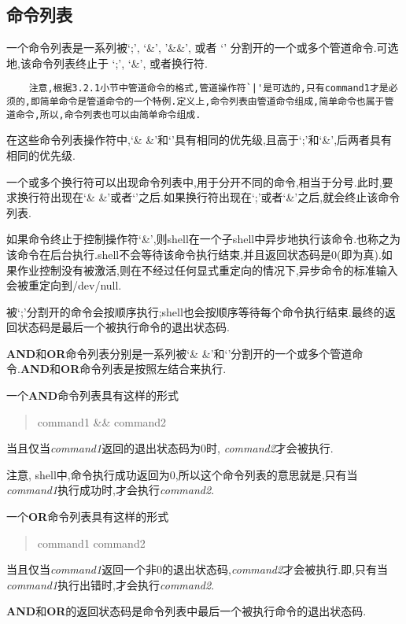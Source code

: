 \documentclass[draft,openany]{book}
\begin{document}
\begin{CJK}{UTF8}{gbsn}
    \subsection{命令列表}
    一个命令列表是一系列被`;', `\&', '\&\&', 或者 `\textbar \textbar' 分割开的一个或多个管道命令.可选地,该命令列表终止于 `;', `\&', 或者换行符.\par
    \begin{verbatim}
    注意,根据3.2.1小节中管道命令的格式,管道操作符`|'是可选的,只有command1才是必须的,即简单命令是管道命令的一个特例.定义上,命令列表由管道命令组成,简单命令也属于管道命令,所以,命令列表也可以由简单命令组成.
    \end{verbatim}
    在这些命令列表操作符中,`\& \&'和`\textbar \textbar'具有相同的优先级,且高于`;'和`\&',后两者具有相同的优先级.\par

    一个或多个换行符可以出现命令列表中,用于分开不同的命令,相当于分号.此时,要求换行符出现在`\& \&'或者`\textbar \textbar'之后.如果换行符出现在`;'或者`\&'之后,就会终止该命令列表.\par
    如果命令终止于控制操作符`\&',则shell在一个子shell中异步地执行该命令.也称之为该命令在后台执行.shell不会等待该命令执行结束,并且返回状态码是0(即为真).如果作业控制没有被激活,则在不经过任何显式重定向的情况下,异步命令的标准输入会被重定向到/dev/null.\par
    被`;'分割开的命令会按顺序执行;shell也会按顺序等待每个命令执行结束.最终的返回状态码是最后一个被执行命令的退出状态码.\par
    \textbf{AND}和\textbf{OR}命令列表分别是一系列被`\& \&'和`\textbar \textbar'分割开的一个或多个管道命令.\textbf{AND}和\textbf{OR}命令列表是按照左结合来执行.\par
    一个\textbf{AND}命令列表具有这样的形式\par
    \begin{quote}
        command1 \&\& command2\par
    \end{quote}
    当且仅当\emph{command1}返回的退出状态码为0时, \emph{command2}才会被执行.\par
    注意, shell中,命令执行成功返回为0,所以这个命令列表的意思就是,只有当\emph{command1}执行成功时,才会执行\emph{command2}.\par
    一个\textbf{OR}命令列表具有这样的形式\par
    \begin{quote}
        command1 \textbar \textbar{} command2
    \end{quote}
    当且仅当\emph{command1}返回一个非0的退出状态码,\emph{command2}才会被执行.即,只有当\emph{command1}执行出错时,才会执行\emph{command2}.\par
    \textbf{AND}和\textbf{OR}的返回状态码是命令列表中最后一个被执行命令的退出状态码.

\end{CJK}
\end{document}
